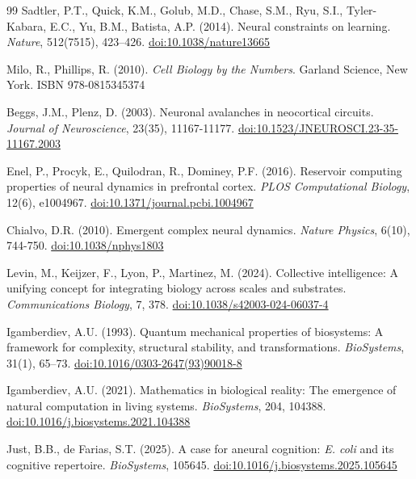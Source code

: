 \documentclass[12pt]{article}
\begin{document}
\begin{thebibliography}{99}
Sadtler, P.T., Quick, K.M., Golub, M.D., Chase, S.M., Ryu, S.I., Tyler-Kabara, E.C., Yu, B.M., Batista, A.P. (2014). Neural constraints on learning. \textit{Nature}, 512(7515), 423--426. \href{https://doi.org/10.1038/nature13665}{doi:10.1038/nature13665}

Milo, R., Phillips, R. (2010). \textit{Cell Biology by the Numbers}. Garland Science, New York. ISBN 978-0815345374

Beggs, J.M., Plenz, D. (2003). Neuronal avalanches in neocortical circuits. \textit{Journal of Neuroscience}, 23(35), 11167-11177. \href{https://doi.org/10.1523/JNEUROSCI.23-35-11167.2003}{doi:10.1523/JNEUROSCI.23-35-11167.2003}

Enel, P., Procyk, E., Quilodran, R., Dominey, P.F. (2016). Reservoir computing properties of neural dynamics in prefrontal cortex. \textit{PLOS Computational Biology}, 12(6), e1004967. \href{https://doi.org/10.1371/journal.pcbi.1004967}{doi:10.1371/journal.pcbi.1004967}

Chialvo, D.R. (2010). Emergent complex neural dynamics. \textit{Nature Physics}, 6(10), 744-750. \href{https://doi.org/10.1038/nphys1803}{doi:10.1038/nphys1803}

Levin, M., Keijzer, F., Lyon, P., Martinez, M. (2024). Collective intelligence: A unifying concept for integrating biology across scales and substrates. \textit{Communications Biology}, 7, 378. \href{https://doi.org/10.1038/s42003-024-06037-4}{doi:10.1038/s42003-024-06037-4}

Igamberdiev, A.U. (1993). Quantum mechanical properties of biosystems: A framework for complexity, structural stability, and transformations. \textit{BioSystems}, 31(1), 65--73. \href{https://doi.org/10.1016/0303-2647(93)90018-8}{doi:10.1016/0303-2647(93)90018-8}

Igamberdiev, A.U. (2021). Mathematics in biological reality: The emergence of natural computation in living systems. \textit{BioSystems}, 204, 104388. \href{https://doi.org/10.1016/j.biosystems.2021.104388}{doi:10.1016/j.biosystems.2021.104388}

Just, B.B., de Farias, S.T. (2025). A case for aneural cognition: \textit{E. coli} and its cognitive repertoire. \textit{BioSystems}, 105645. \href{https://doi.org/10.1016/j.biosystems.2025.105645}{doi:10.1016/j.biosystems.2025.105645}


\end{thebibliography}
\end{document}
